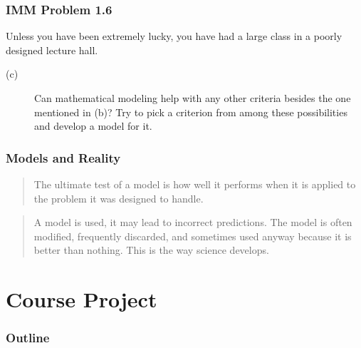 \begin{frame}
    \frametitle{IMM Problem 1.6}
    Unless you have been extremely lucky, you have had a large class in a
    poorly designed lecture hall. 
    
    \vskip0.25in
    \begin{description}
        \item[(c)] Can mathematical modeling help with any other criteria
    besides the one mentioned in (b)? Try to pick a criterion from among these
    possibilities and develop a model for it.
    \end{description}
\end{frame}
     
\begin{frame}
    \frametitle{Models and Reality}
    \begin{verse}
        The ultimate test of a model is how well it performs when 
        it is applied to the problem it was designed to handle.
    \end{verse}
    \vskip0.5in
    \begin{verse}
       A model is used, it may lead to incorrect predictions. The model is
       often modified, frequently discarded, and sometimes used anyway because
       it is better than nothing. This is the way science develops.  
    \end{verse}
\end{frame}




\section{Course Project}

\begin{frame}
    \frametitle{Outline}
\end{frame}


